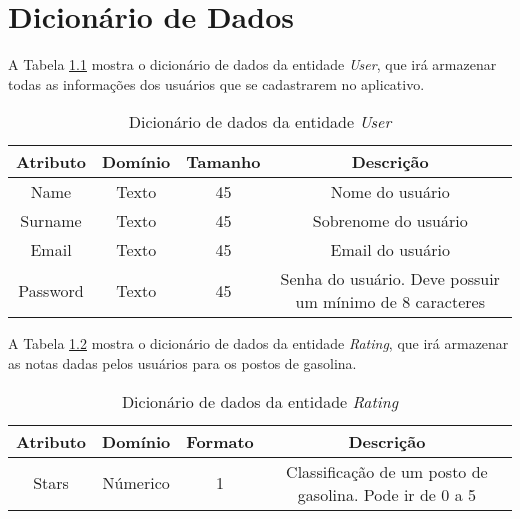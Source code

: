 \chapter{Dicionário de Dados}
\label{chap:dicionario}

A Tabela \ref{dic:user} mostra o dicionário de dados da entidade \textit{User}, que irá armazenar todas as informações dos usuários que se cadastrarem no aplicativo.
\begin{table}[H]
\centering
\caption{Dicionário de dados da entidade \textit{User}}
\label{dic:user}
\begin{tabular}{cccc}
\toprule
\textbf{Atributo} & \textbf{Domínio} & \textbf{Tamanho} & \textbf{Descrição} \\
\midrule
Name                            & Texto                          & 45                             & Nome do usuário \\
Surname                         & Texto                          & 45                             & Sobrenome do usuário\\
Email                           & Texto                          & 45                             & Email do usuário\\
Password                        & Texto                          & 45                             & Senha do usuário. Deve possuir um mínimo de 8 caracteres\\
\bottomrule
\end{tabular}
\end{table}

A Tabela \ref{dic:rating} mostra o dicionário de dados da entidade \textit{Rating}, que irá armazenar as notas dadas pelos usuários para os postos de gasolina.
\begin{table}[H]
\centering
\caption{Dicionário de dados da entidade \textit{Rating}}
\label{dic:rating}
\begin{tabular}{cccc}
\toprule
\textbf{Atributo} & \textbf{Domínio} & \textbf{Formato} & \textbf{Descrição} \\
\midrule
Stars                           & Númerico                       & 1                              & Classificação de um posto de gasolina. Pode ir de 0 a 5\\
\bottomrule
\end{tabular}
\end{table}


